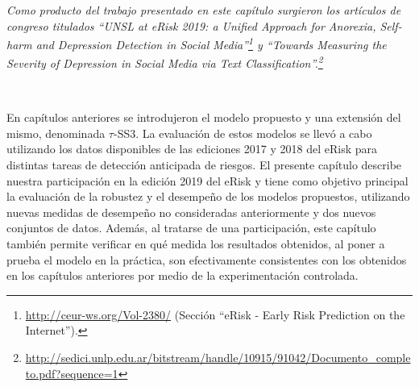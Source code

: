 \emph{Como producto del trabajo presentado en este capítulo surgieron los artículos de congreso titulados ``UNSL at eRisk 2019: a Unified Approach for Anorexia, Self-harm and Depression Detection in Social Media''\footnote{\url{http://ceur-ws.org/Vol-2380/} (Sección ``eRisk - Early Risk Prediction on the Internet'').} y ``Towards Measuring the Severity of Depression in Social Media via Text Classification''.\footnote{\url{http://sedici.unlp.edu.ar/bitstream/handle/10915/91042/Documento_completo.pdf?sequence=1}}}

\

En capítulos anteriores se introdujeron el modelo propuesto y una extensión del mismo, denominada $\tau$-SS3. La evaluación de estos modelos se llevó a cabo utilizando los datos disponibles de las ediciones 2017 y 2018 del eRisk para distintas tareas de detección anticipada de riesgos.
El presente capítulo describe nuestra participación en la edición 2019 del eRisk y tiene como objetivo principal la evaluación de la robustez y el desempeño de los modelos propuestos, utilizando nuevas medidas de desempeño no consideradas anteriormente y dos nuevos conjuntos de datos.
Además, al tratarse de una participación, este capítulo también permite verificar en qué medida los resultados obtenidos, al poner a prueba el modelo en la práctica, son efectivamente consistentes con los obtenidos en los capítulos anteriores por medio de la experimentación controlada.



